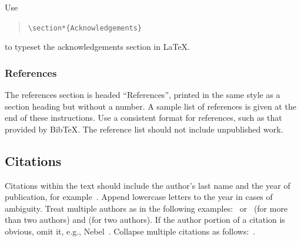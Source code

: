 \documentclass{article}
\begin{document}
Use
\begin{quote}
    {\tt \textbackslash{}section*\{Acknowledgements\}}
\end{quote}
to typeset the acknowledgements section in \LaTeX{}.





\subsubsection{References}

The references section is headed ``References'', printed in the same
style as a section heading but without a number. A sample list of
references is given at the end of these instructions. Use a consistent
format for references, such as that provided by Bib\TeX{}. The reference
list should not include unpublished work.

\subsection{Citations}

Citations within the text should include the author's last name and
the year of publication, for example~\cite{gottlob:nonmon}.  Append
lowercase letters to the year in cases of ambiguity.  Treat multiple
authors as in the following examples:~\cite{abelson-et-al:scheme}
or~\cite{bgf:Lixto} (for more than two authors) and
\cite{brachman-schmolze:kl-one} (for two authors).  If the author
portion of a citation is obvious, omit it, e.g.,
Nebel~.  Collapse multiple citations as
follows:~\cite{gls:hypertrees,levesque:functional-foundations}.
\nocite{abelson-et-al:scheme}
\nocite{bgf:Lixto}
\nocite{brachman-schmolze:kl-one}
\nocite{gottlob:nonmon}
\nocite{gls:hypertrees}
\nocite{levesque:functional-foundations}
\nocite{levesque:belief}
\nocite{nebel:jair-2000}
\end{document}
